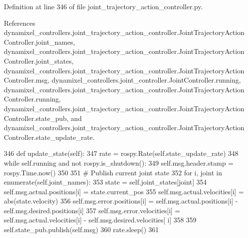 Definition at line 346 of file joint\+\_\+trajectory\+\_\+action\+\_\+controller.\+py.



References dynamixel\+\_\+controllers.\+joint\+\_\+trajectory\+\_\+action\+\_\+controller.\+Joint\+Trajectory\+Action\+Controller.\+joint\+\_\+names, dynamixel\+\_\+controllers.\+joint\+\_\+trajectory\+\_\+action\+\_\+controller.\+Joint\+Trajectory\+Action\+Controller.\+joint\+\_\+states, dynamixel\+\_\+controllers.\+joint\+\_\+trajectory\+\_\+action\+\_\+controller.\+Joint\+Trajectory\+Action\+Controller.\+msg, dynamixel\+\_\+controllers.\+joint\+\_\+controller.\+Joint\+Controller.\+running, dynamixel\+\_\+controllers.\+joint\+\_\+trajectory\+\_\+action\+\_\+controller.\+Joint\+Trajectory\+Action\+Controller.\+running, dynamixel\+\_\+controllers.\+joint\+\_\+trajectory\+\_\+action\+\_\+controller.\+Joint\+Trajectory\+Action\+Controller.\+state\+\_\+pub, and dynamixel\+\_\+controllers.\+joint\+\_\+trajectory\+\_\+action\+\_\+controller.\+Joint\+Trajectory\+Action\+Controller.\+state\+\_\+update\+\_\+rate.


\begin{DoxyCode}
346     \textcolor{keyword}{def }update\_state(self):
347         rate = rospy.Rate(self.state\_update\_rate)
348         \textcolor{keywordflow}{while} self.running \textcolor{keywordflow}{and} \textcolor{keywordflow}{not} rospy.is\_shutdown():
349             self.msg.header.stamp = rospy.Time.now()
350             
351             \textcolor{comment}{# Publish current joint state}
352             \textcolor{keywordflow}{for} i, joint \textcolor{keywordflow}{in} enumerate(self.joint\_names):
353                 state = self.joint\_states[joint]
354                 self.msg.actual.positions[i] = state.current\_pos
355                 self.msg.actual.velocities[i] = abs(state.velocity)
356                 self.msg.error.positions[i] = self.msg.actual.positions[i] - self.msg.desired.positions[i]
357                 self.msg.error.velocities[i] = self.msg.actual.velocities[i] - self.msg.desired.velocities[
      i]
358                 
359             self.state\_pub.publish(self.msg)
360             rate.sleep()
361 \end{DoxyCode}


